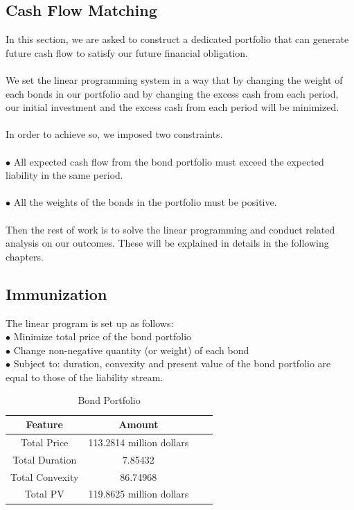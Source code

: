 \documentclass[oneside,12pt]{report}
\begin{document}
\subsection{Cash Flow Matching}

In this section, we are asked to construct a dedicated portfolio that can generate future cash flow to satisfy our future financial obligation.\\
\\
 We set the linear programming system in a way that by changing the weight of each bonds in our portfolio and by changing the excess cash from each period, our initial investment and the excess cash from each period will be minimized. \\
\\
In order to achieve so, we imposed two constraints. \\
\\
\noindent $\bullet$ All expected cash flow from the bond portfolio must exceed the expected liability in the same period.\\
\\
$\bullet$ All the weights of the bonds in the portfolio must be positive.  \\
\\
Then the rest of work is to solve the linear programming and conduct related analysis on our outcomes. These will be explained in details in the following chapters.

\subsection{Immunization}
\vspace{8pt}
The linear program is set up as follows:\\

\noindent $\bullet$ Minimize total price of the bond portfolio\\
\noindent $\bullet$ Change non-negative quantity (or weight) of each bond\\
\noindent $\bullet$ Subject to: duration, convexity and present value of the bond portfolio are equal to those of the liability stream.\\

\begin{table}[h]
\centering  
\begin{tabular}{cccc}
\hline
Feature  &Amount\\ \hline  
Total Price  &113.2814 million dollars\\
Total Duration  &7.85432\\ 
Total Convexity  &86.74968\\ 
Total PV  &119.8625 million dollars\\ 
\hline
\end{tabular}
\caption{Bond Portfolio	}
\end{table}
　
	
\end{document}
